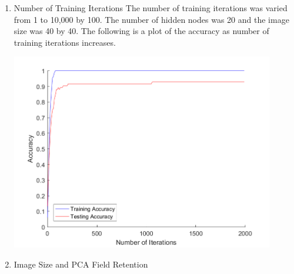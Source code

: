 \documentclass[12pt]{article}
\begin{document}
\begin{enumerate}
  \item Number of Training Iterations
  The number of training iterations was varied from 1 to 10,000 by 100. The number of hidden nodes was 20 and the image size was 40 by 40. The following is a plot of the accuracy as number of training iterations increases.
  \begin{center}
    \includegraphics[width=115mm]{./accuracy_imgs/num_iterations_empirical.png}
    \label{fig:num_iterations}
  \end{center}

  \item Image Size and PCA Field Retention



\end{enumerate}
\end{document}

